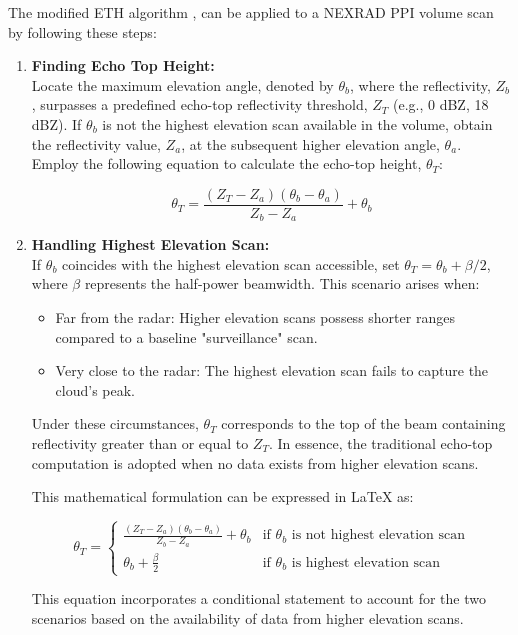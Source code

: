The modified ETH algorithm \cite{AnImprovedMethodforEstimatingRadarEchoTopHeight}, can
be applied to a NEXRAD PPI volume scan by following these steps:
\begin{enumerate}
    \item \textbf{Finding Echo Top Height:} \\
          Locate the maximum elevation angle, denoted by $\theta_{b}$, where the
          reflectivity, $Z_{b}$, surpasses a predefined echo-top reflectivity threshold,
          $Z_T$ (e.g., 0 dBZ, 18 dBZ). If $\theta_{b}$ is not the highest elevation scan
          available in the volume, obtain the reflectivity value, $Z_{a}$, at the
          subsequent higher elevation angle, $\theta_{a}$. Employ the following equation
          to calculate the echo-top height, $\theta_T$:

          $$\theta_T = \frac{(Z_T - Z_a) (\theta_b - \theta_a)}{Z_b - Z_a} + \theta_b$$

    \item \textbf{Handling Highest Elevation Scan:}\\
          If $\theta_{b}$ coincides with the highest elevation scan accessible, set
          $\theta_{T} = \theta_{b} + \beta/2$, where $\beta$ represents the half-power
          beamwidth. This scenario arises when:
          \begin{itemize}
              \item Far from the radar: Higher elevation scans possess shorter ranges
                    compared to a baseline "surveillance" scan.
              \item Very close to the radar: The highest elevation scan fails to
                    capture the cloud's peak.
          \end{itemize}

          Under these circumstances, $\theta_{T}$ corresponds to the top of the beam
          containing reflectivity greater than or equal to $Z_T$. In essence, the
          traditional echo-top computation is adopted when no data exists from higher
          elevation scans.

          This mathematical formulation can be expressed in LaTeX as:

          $$\theta_T = \begin{cases} \frac{(Z_T - Z_a) (\theta_b - \theta_a)}{Z_b - Z_a} +
                  \theta_b                   & \text{if } \theta_b \text{ is not highest elevation scan} \\
                  \theta_b + \frac{\beta}{2} & \text{if } \theta_b \text{ is highest elevation
                      scan}\end{cases}$$

          This equation incorporates a conditional statement to account for the two
          scenarios based on the availability of data from higher elevation scans.

\end{enumerate}